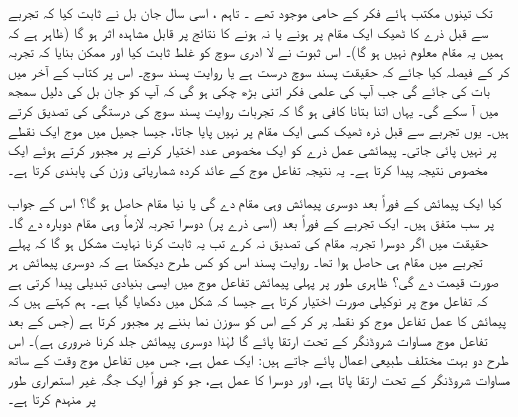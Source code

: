   تک تینوں  مکتب ہائے فکر  کے حامی موجود  تھے ۔  تاہم ، اسی سال جان بل نے ثابت کیا کہ تجربے سے قبل ذرے کا  ٹھیک  ایک مقام پر  ہونے یا نہ ہونے کا  نتائج  پر قابل مشاہدہ اثر  ہو گا (ظاہر ہے کہ ہمیں یہ مقام معلوم نہیں ہو گا)۔ اس ثبوت نے لا ادری سوچ کو غلط ثابت کیا اور ممکن بنایا کہ   تجربہ کر کے فیصلہ کیا جائے کہ  حقیقت پسند سوچ درست ہے یا روایت پسند سوچ۔ اس پر کتاب کے آخر میں بات کی جائے گی جب آپ کی علمی فکر اتنی بڑھ چکی ہو گی کہ آپ کو جان بل کی دلیل سمجھ میں آ سکے گی۔ یہاں اتنا بتانا کافی ہو گا کہ تجربات روایت پسند سوچ کی درستگی کی تصدیق کرتے ہیں۔ یوں تجربے سے قبل  ذرہ ٹھیک کسی ایک مقام پر نہیں پایا جاتا، جیسا جھیل میں موج ایک نقطے پر نہیں پائی جاتی۔  پیمائشی عمل ذرے کو ایک مخصوص عدد اختیار کرنے پر مجبور کرتے ہوئے ایک مخصوص نتیجہ پیدا کرتا ہے۔ یہ نتیجہ تفاعل موج کے عائد کردہ شماریاتی وزن کی پابندی کرتا ہے۔

 کیا ایک پیمائش کے فوراً بعد دوسری پیمائش وہی مقام  دے گی یا نیا مقام حاصل ہو گا؟ اس کے جواب پر سب متفق ہیں۔ ایک تجربے کے فوراً بعد (اسی ذرے پر) دوسرا تجربہ لازماً وہی مقام دوبارہ دے گا۔ حقیقت میں اگر دوسرا تجربہ مقام  کی تصدیق نہ کرے تب یہ ثابت کرنا نہایت مشکل ہو گا کہ پہلے تجربے میں مقام  ہی حاصل ہوا تھا۔ روایت پسند اس کو کس طرح دیکھتا ہے کہ دوسری پیمائش ہر صورت  قیمت دے گی؟ ظاہری طور پر پہلی پیمائش تفاعل موج میں ایسی بنیادی تبدیلی پیدا کرتی ہے کہ تفاعل موج  پر نوکیلی صورت اختیار کرتا ہے جیسا کہ شکل  میں دکھایا گیا ہے۔ ہم کہتے ہیں کہ پیمائش کا عمل تفاعل موج کو نقطہ  پر  کر کے اس کو سوزن نما  بننے پر مجبور کرتا ہے (جس کے بعد تفاعل موج  مساوات شروڈنگر کے تحت ارتقا پائے گا لہٰذا دوسری پیمائش جلد کرنا ضروری ہے)۔ اس طرح دو بہت مختلف طبیعی اعمال پائے جاتے ہیں: ایک    عمل  ہے،  جس  میں تفاعل موج وقت کے ساتھ مساوات شروڈنگر کے تحت ارتقا پاتا ہے، اور دوسرا        کا  عمل ہے،  جو  کو فوراً ایک جگہ غیر استمراری طور پر منہدم کرتا ہے۔ 

